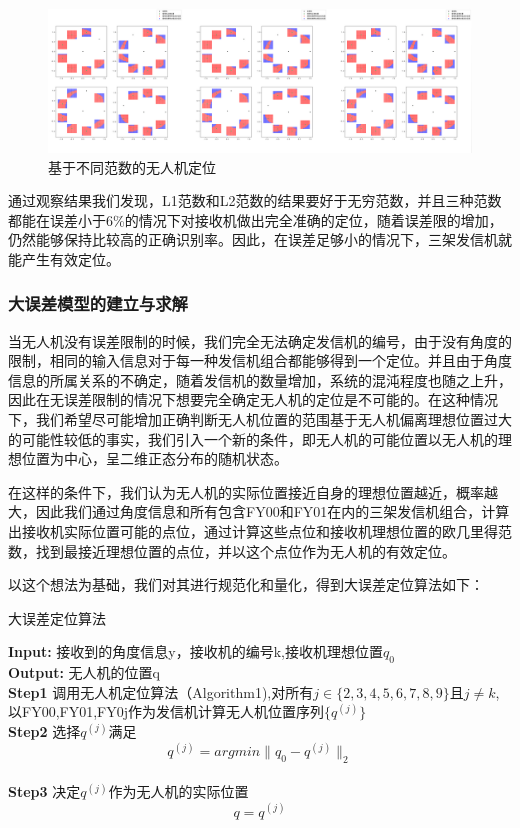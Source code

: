 \documentclass{my_paper}
\begin{document}
\begin{figure}[H]
    \centering
    \includegraphics[width=1\textwidth]{two}
    \caption{基于不同范数的无人机定位} 
\end{figure}

通过观察结果我们发现，L1范数和L2范数的结果要好于无穷范数，并且三种范数都能在误差小于6\%的情况下对接收机做出完全准确的定位，随着误差限的增加，仍然能够保持比较高的正确识别率。因此，在误差足够小的情况下，三架发信机就能产生有效定位。


\subsubsection{大误差模型的建立与求解}
当无人机没有误差限制的时候，我们完全无法确定发信机的编号，由于没有角度的限制，相同的输入信息对于每一种发信机组合都能够得到一个定位。并且由于角度信息的所属关系的不确定，随着发信机的数量增加，系统的混沌程度也随之上升，因此在无误差限制的情况下想要完全确定无人机的定位是不可能的。在这种情况下，我们希望尽可能增加正确判断无人机位置的范围基于无人机偏离理想位置过大的可能性较低的事实，我们引入一个新的条件，即无人机的可能位置以无人机的理想位置为中心，呈二维正态分布的随机状态。

在这样的条件下，我们认为无人机的实际位置接近自身的理想位置越近，概率越大，因此我们通过角度信息和所有包含FY00和FY01在内的三架发信机组合，计算出接收机实际位置可能的点位，通过计算这些点位和接收机理想位置的欧几里得范数，找到最接近理想位置的点位，并以这个点位作为无人机的有效定位。

以这个想法为基础，我们对其进行规范化和量化，得到大误差定位算法如下：
\begin{algorithm}[H]
\caption{\small 大误差定位算法}
\textbf{Input:} 接收到的角度信息y，接收机的编号k,接收机理想位置$q_0$\\
\textbf{Output:} 无人机的位置q\\
\textbf{Step1} 调用无人机定位算法（Algorithm1),对所有$j\in\{2,3,4,5,6,7,8,9\}$且$j\neq k$,以FY00,FY01,FY0j作为发信机计算无人机位置序列$\{q^{(j)}\}$\\
\textbf{Step2} 选择$q^{(j)}$满足$$q ^ { ( j ) } = argmin \| q_0 - q ^ { ( j ) } \| _ { 2 }$$ \\
\textbf{Step3} 决定$q^{(j)}$作为无人机的实际位置$$q= q ^ { ( j ) }$$
\end{algorithm}
\end{document}
